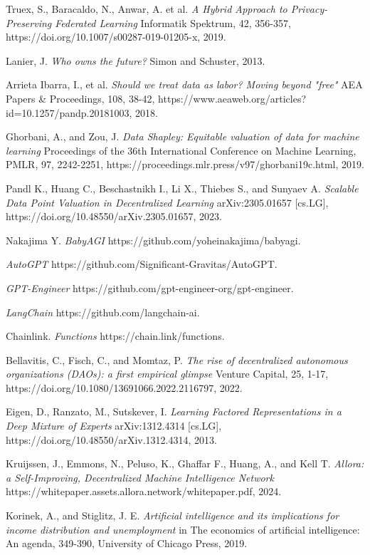\documentclass[conference]{IEEEtran}
\begin{document}
\begin{thebibliography}{}
Truex, S., Baracaldo, N., Anwar, A. et al. \emph{A Hybrid Approach to Privacy-Preserving Federated Learning} Informatik Spektrum, 42, 356-357, https://doi.org/10.1007/s00287-019-01205-x, 2019.

Lanier, J. \emph{Who owns the future?} Simon and Schuster, 2013.

Arrieta Ibarra, I., et al. \emph{Should we treat data as labor? Moving beyond "free"} AEA Papers \& Proceedings, 108, 38-42, https://www.aeaweb.org/articles?id=10.1257/pandp.20181003, 2018.

Ghorbani, A., and Zou, J. \emph{Data Shapley: Equitable valuation of data for machine learning} Proceedings of the 36th International Conference on Machine Learning, PMLR, 97, 2242-2251, https://proceedings.mlr.press/v97/ghorbani19c.html, 2019.

Pandl K., Huang C., Beschastnikh I., Li X., Thiebes S., and Sunyaev A. \emph{Scalable Data Point Valuation in Decentralized Learning} arXiv:2305.01657 [cs.LG], 
https://doi.org/10.48550/arXiv.2305.01657, 2023.

Nakajima Y. \emph{BabyAGI} https://github.com/yoheinakajima/babyagi.

\emph{AutoGPT} https://github.com/Significant-Gravitas/AutoGPT.

\emph{GPT-Engineer} https://github.com/gpt-engineer-org/gpt-engineer.

\emph{LangChain} https://github.com/langchain-ai.

Chainlink. \emph{Functions} https://chain.link/functions.

Bellavitis, C., Fisch, C., and Momtaz, P. \emph{The rise of decentralized autonomous organizations (DAOs): a first empirical glimpse} Venture Capital, 25, 1-17, https://doi.org/10.1080/13691066.2022.2116797, 2022.

Eigen, D., Ranzato, M., Sutskever, I. \emph{Learning Factored Representations in a Deep Mixture of Experts} arXiv:1312.4314 [cs.LG], https://doi.org/10.48550/arXiv.1312.4314, 2013.

Kruijssen, J., Emmons, N., Peluso, K., Ghaffar F., Huang, A., and Kell T. \emph{Allora: a Self-Improving, Decentralized Machine Intelligence Network} https://whitepaper.assets.allora.network/whitepaper.pdf, 2024.

Korinek, A., and Stiglitz, J. E. \emph{Artificial intelligence and its implications for income distribution and unemployment} in The economics of artificial intelligence: An agenda, 349-390, University of Chicago Press, 2019.


\end{thebibliography}
\end{document}

